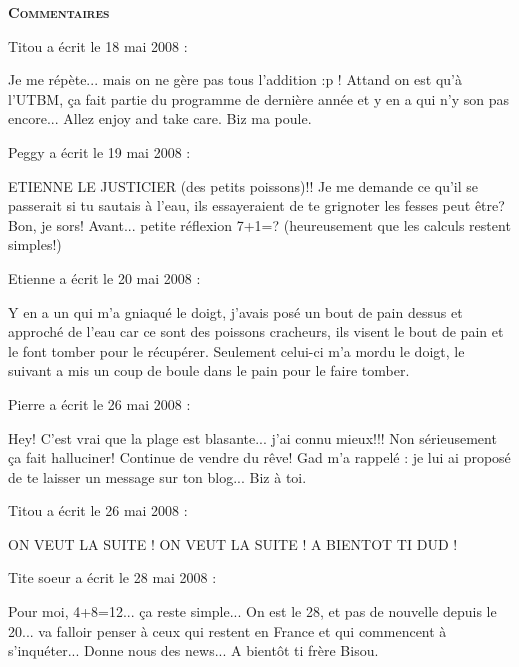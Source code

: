 \bigskip
\textbf{\textsc{Commentaires}}

\medskip
Titou a écrit le 18 mai 2008 :
\begin{displayquote}
Je me répète... mais on ne gère pas tous l'addition :p ! Attand on est qu'à l'UTBM, ça fait partie du programme de dernière année  et y en a qui n'y son pas encore...
Allez enjoy and take care. Biz ma poule.
\end{displayquote}

\medskip
Peggy a écrit le 19 mai 2008 :
\begin{displayquote}
ETIENNE LE JUSTICIER (des petits poissons)!!
Je me demande ce qu'il se passerait si tu sautais à l'eau, ils essayeraient de te grignoter les fesses peut être?
Bon, je sors!
Avant... petite réflexion 7+1=? (heureusement que les calculs restent simples!)
\end{displayquote}

\medskip
Etienne a écrit le 20 mai 2008 :
\begin{displayquote}
Y en a un qui m'a gniaqué le doigt, j'avais posé un bout de pain dessus et approché de l'eau car ce sont des poissons cracheurs, ils visent le bout de pain et le font tomber pour le récupérer. Seulement celui-ci m'a mordu le doigt, le suivant a mis un coup de boule dans le pain pour le faire tomber.
\end{displayquote}

\medskip
Pierre a écrit le 26 mai 2008 :
\begin{displayquote}
Hey!
C'est vrai que la plage est blasante... j'ai connu mieux!!!
Non sérieusement ça fait halluciner!
Continue de vendre du rêve!
Gad m'a rappelé : je lui ai proposé de te laisser un message sur ton blog...
Biz à toi.
\end{displayquote}

\medskip
Titou a écrit le 26 mai 2008 :
\begin{displayquote}
ON VEUT LA SUITE ! ON VEUT LA SUITE !
A BIENTOT TI DUD !
\end{displayquote}

\medskip
Tite soeur a écrit le 28 mai 2008 :
\begin{displayquote}
Pour moi, 4+8=12... ça reste simple...
On est le 28, et pas de nouvelle depuis le 20... va falloir penser à ceux qui restent en France et qui commencent à s'inquéter...
Donne nous des news...
A bientôt ti frère
Bisou.
\end{displayquote}

\vfill
